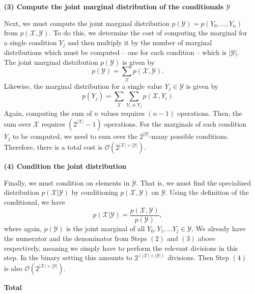 \textbf{(3) Compute the joint marginal distribution of the conditionals $\mathcal{Y}$}
\vspace{-4mm}

\begin{myindentpar}{1.5em}
\null \quad \quad Next, we must compute the joint marginal distribution $p(\mathcal{Y}) = p(Y_{0},...,Y_{n})$ from $p(\mathcal{X},\mathcal{Y})$. To do this, we determine the cost of computing the marginal for a single condition $Y_{j}$ and then multiply it by the number of marginal distributions which must be computed -- one for each condition -- which is $|\mathcal{Y}|$. The joint marginal distribution $p(\mathcal{Y})$ is given by 
$$p(\mathcal{Y}) = \sum_{\mathcal{X}} p(\mathcal{X}, \mathcal{Y}).$$
Likewise, the marginal distribution for a single value $Y_{j} \in \mathcal{Y}$ is given by
$$p(Y_{j}) = \sum_{\mathcal{X}} \sum_{Y_{i} \neq Y_{j}} p(\mathcal{X}, Y_{i})$$
 Again, computing the sum of $n$ values requires $(n-1)$ operations. Then, the sum over $\mathcal{X}$ requires $(2^{|\mathcal{X}|}-1)$ operations. For the marginals of each condition $Y_{j}$ to be computed, we need to sum over the $2^{|\mathcal{Y}|}$-many possible conditions. Therefore, there is a total cost is $\mathcal{O}(2^{|\mathcal{X}| + |\mathcal{Y}|})$.
\end{myindentpar}

\newpage

\textbf{(4) Condition the joint distribution}
\vspace{-4mm}

\begin{myindentpar}{1.5em}
\null \quad \quad Finally, we must condition on elements in $\mathcal{Y}$. That is, we must find the specialized distribution $p(\mathcal{X}|\mathcal{Y})$ by conditioning $p(\mathcal{X}, \mathcal{Y})$ on $\mathcal{Y}$. Using the definition of the conditional, we have
$$p(\mathcal{X}|\mathcal{Y}) = \frac{p(\mathcal{X},\mathcal{Y})}{p(\mathcal{Y})},$$
where again, $p(\mathcal{Y})$ is the joint marginal of all $Y_{0}, Y_{1},...Y_{j} \in \mathcal{Y}$. We already have the numerator and the denominator from Steps $(2)$ and $(3)$ above respectively, meaning we simply have to perform the relevant divisions in this step. In the binary setting this amounts to $2^{(|\mathcal{X}| + |\mathcal{Y}|)}$ divisions. Then Step $(4)$ is also $\mathcal{O}(2^{|\mathcal{X}|+|\mathcal{Y}|})$.
\end{myindentpar}

\textbf{Total}
\vspace{-4mm}

